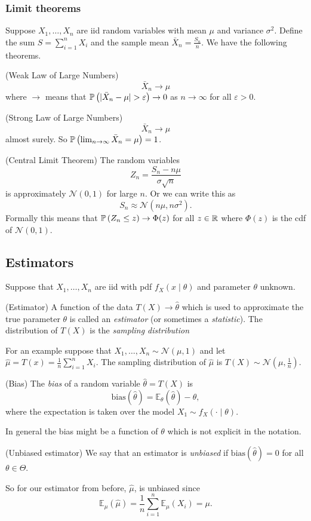 \documentclass{article}
\begin{document}
\subsubsection{Limit theorems}
Suppose $ X_1,\dots, X_n $ are iid random variables with mean $ \mu $ and variance $ \sigma^2 $. Define the sum $ S=\sum_{i=1}^n X_i $ and the sample mean $ \bar X_n = \frac{S_n}n $. We have the following theorems.
\begin{theorem}
	(Weak Law of Large Numbers)
	\[
	  \bar X_n\to \mu
	\]
	where $ \to $ means that $ \prob{|\bar X_n-\mu|>\varepsilon}\to 0 $ as $ n\to \infty $ for all $ \varepsilon>0 $.
\end{theorem}
\begin{theorem}
	(Strong Law of Large Numbers)
	\[ \bar X_n\to \mu \]
	almost surely. So $ \mathbb{P}\left({\lim_{n\to\infty}\bar X_n=\mu}\right)=1 $.
\end{theorem}
\begin{theorem}
	(Central Limit Theorem)
	The random variables
	\[
		Z_n = \frac{S_n-n\mu}{\sigma\sqrt n}
	\]
	is approximately $ \mathcal N(0,1) $ for large $ n $. Or we can write this as
	\[
	  S_n\approx \mathcal N(n\mu, n\sigma^2).
	\]
	Formally this means that $ \mathbb{P}\left({Z_n\le z}\right)\to \Phi(z) $ for all $ z\in \mathbb{R} $ where $ \Phi(z) $ is the cdf of $ \mathcal N(0,1) $.
\end{theorem}
\subsection{Estimators}
Suppose that $ X_1,\dots, X_n $ are iid with pdf $ f_X(x\mid \theta) $ and parameter $ \theta $ unknown.
\begin{definition}
	(Estimator) A function of the data $ T(X)\to\hat\theta $ which is used to approximate the true parameter $ \theta $ is called an \textit{estimator} (or sometimes a \textit{statistic}). The distribution of $ T(X) $ is the \textit{sampling distribution}
\end{definition}
For an example suppose that $ X_1,\dots, X_n\sim\mathcal N(\mu,1) $ and let $ \hat \mu = T(x) = \frac 1n \sum_{i=1}^n X_i $. The sampling distribution of $ \hat \mu $ is $ T(X)\sim \mathcal N(\mu, \frac 1{n}) $.
\begin{definition}
	(Bias) The \textit{bias} of a random variable $ \hat\theta=T(X) $ is 
	\[
		\mathrm{bias}(\hat\theta) = \mathbb E_\theta(\hat\theta)-\theta,
	\]
	where the expectation is taken over the model $ X_1\sim f_X(\cdot \mid \theta) $.
\end{definition}
\begin{remark}
 In general the bias might be a function of $ \theta $ which is not explicit in the notation.
\end{remark}
\begin{definition}
	(Unbiased estimator) We say that an estimator is \textit{unbiased} if $ \mathrm{bias}(\hat\theta)=0 $ for all $ \theta\in\Theta $.
\end{definition}
So for our estimator from before, $ \hat\mu $, is unbiased since
\[
	\mathbb E_\mu(\hat \mu) = \frac 1n\sum_{i=1}^n \mathbb E_\mu(X_i) = \mu.
\]
\end{document}

